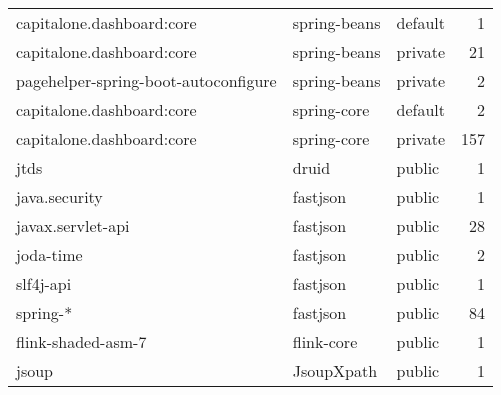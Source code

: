 \begin{table}[ht]
\begin{tabular}{lllr}
  capitalone.dashboard:core & spring-beans & default & 1 \\ 
  capitalone.dashboard:core & spring-beans & private & 21 \\ 
  pagehelper-spring-boot-autoconfigure & spring-beans & private & 2 \\ 
  capitalone.dashboard:core & spring-core & default & 2 \\ 
  capitalone.dashboard:core & spring-core & private & 157 \\ 
  jtds & druid & public & 1 \\ 
  java.security & fastjson & public & 1 \\ 
  javax.servlet-api & fastjson & public & 28 \\ 
  joda-time & fastjson & public & 2 \\ 
  slf4j-api & fastjson & public & 1 \\ 
  spring-* & fastjson & public & 84 \\ 
  flink-shaded-asm-7 & flink-core & public & 1 \\ 
  jsoup & JsoupXpath & public & 1 \\ 
   \hline
\end{tabular}
\endgroup
\end{table}
